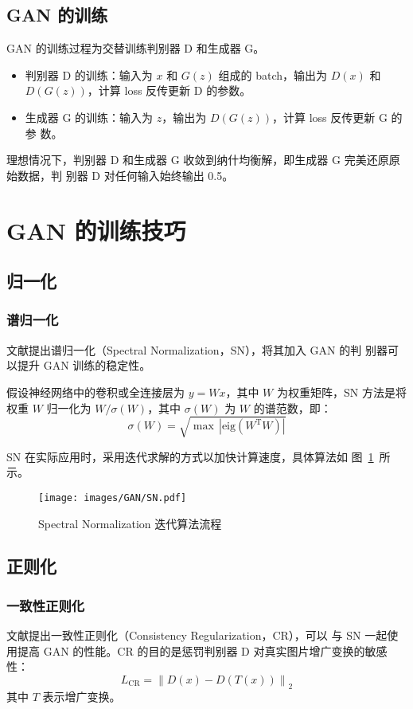 \subsection{GAN 的训练}

GAN 的训练过程为交替训练判别器 D 和生成器 G。

\begin{itemize}
  \item 判别器 D 的训练：输入为 $x$ 和 $G(z)$ 组成的 batch，输出为 $D(x)$ 和
    $D(G(z))$，计算 loss 反传更新 D 的参数。
  \item 生成器 G 的训练：输入为 $z$，输出为 $D(G(z))$，计算 loss 反传更新 G 的参
    数。
\end{itemize}

理想情况下，判别器 D 和生成器 G 收敛到纳什均衡解，即生成器 G 完美还原原始数据，判
别器 D 对任何输入始终输出 0.5。

\section{GAN 的训练技巧}
\subsection{归一化}
\subsubsection{谱归一化}
文献提出谱归一化（Spectral Normalization，SN），将其加入 GAN 的判
别器可以提升 GAN 训练的稳定性。

假设神经网络中的卷积或全连接层为 $y = Wx$，其中 $W$ 为权重矩阵，SN 方法是将权重
$W$ 归一化为 $W/\sigma(W)$，其中 $\sigma(W)$ 为 $W$ 的谱范数，即：
\begin{equation}
  \sigma(W) = \sqrt{\max \, \left | \mathrm{eig} (W^{\mathrm{T}} W) \right |}
\end{equation}

SN 在实际应用时，采用迭代求解的方式以加快计算速度，具体算法如
图~\ref{fig:sn-algo}~所示。

\begin{figure}[ht]
  \centering
  \texttt{[image: images/GAN/SN.pdf]}
  \caption{Spectral Normalization 迭代算法流程}\label{fig:sn-algo}
\end{figure}

\subsection{正则化}
\subsubsection{一致性正则化}
文献提出一致性正则化（Consistency Regularization，CR），可以
与 SN 一起使用提高 GAN 的性能。CR 的目的是惩罚判别器 D 对真实图片增广变换的敏感性：
\begin{equation}
  L_{\mathrm{CR}} = \left\| D(x) - D(T(x)) \right\|_2
\end{equation}
其中 $T$ 表示增广变换。

